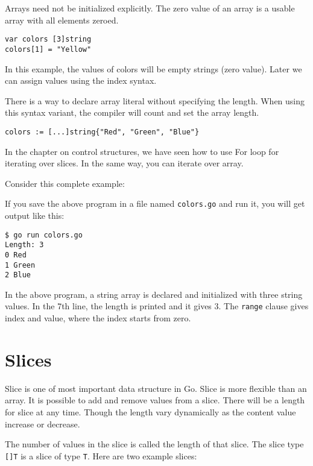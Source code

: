 Arrays need not be initialized explicitly. The zero value of an
array is a usable array with all elements zeroed.

\begin{lstlisting}[numbers=none]
var colors [3]string
colors[1] = "Yellow"
\end{lstlisting}

In this example, the values of colors will be empty strings (zero
value).  Later we can assign values using the index syntax.

There is a way to declare array literal without specifying the length.
When using this syntax variant, the compiler will count and set the
array length.

\begin{lstlisting}[numbers=none]
colors := [...]string{"Red", "Green", "Blue"}
\end{lstlisting}

In the chapter on control structures, we have seen how to use For loop
for iterating over slices.  In the same way, you can iterate over
array.

Consider this complete example:



If you save the above program in a file named \texttt{colors.go} and
run it, you will get output like this:

\begin{lstlisting}[numbers=none]
$ go run colors.go
Length: 3
0 Red
1 Green
2 Blue
\end{lstlisting}

In the above program, a string array is declared and initialized with
three string values.  In the 7th line, the length is printed and it
gives 3. The \texttt{range} clause gives index and value, where the
index starts from zero.

\section{Slices}

Slice is one of most important data structure in Go.
Slice is more flexible than an array.  It is possible to add and
remove values from a slice.  There will be a length for slice at any
time.  Though the length vary dynamically as the content value
increase or decrease.

The number of values in the slice is called the length of that slice.
The slice type \texttt{[]T} is a slice of type \texttt{T}.  Here are
two example slices:


